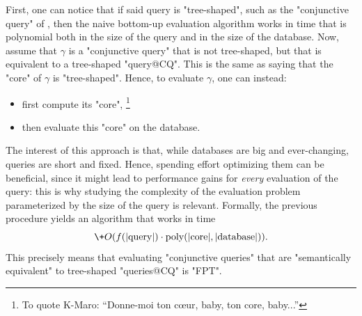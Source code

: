 \begin{marginfigure}
	\centering
	\caption{
		\AP\label{fig:intro-tree-shaped-CQ}
		A "tree-shaped" "conjunctive query" over a "signature"
		with three binary relations denoted by $a$, $b$ and~$c$.
	}
\end{marginfigure}
First, one can notice that if said query is "tree-shaped",
such as the "conjunctive query" of , then the naive
bottom-up evaluation algorithm works in time that is polynomial both
in the size of the query and in the size of the database.
Now, assume that $\gamma$ is a "conjunctive query" that is not
tree-shaped, but that is equivalent to a tree-shaped "query@CQ".
This is the same as saying that the "core" of $\gamma$ is "tree-shaped".
Hence, to evaluate $\gamma$, one can instead:
\begin{itemize}
	\item first compute its "core",%
	\footnote{To quote K-Maro: ``Donne-moi ton cœur, baby, ton core, baby...''}
	\item then evaluate this "core" on the database.
\end{itemize}
The interest of this approach is that, while databases are big and ever-changing,
queries are short and fixed. Hence, spending effort optimizing them can be beneficial,
since it might lead to performance gains
for \emph{every} evaluation of the query: this is why studying the
complexity of the evaluation problem parameterized by the size of
the query is relevant.
Formally, the previous procedure yields an algorithm that works in time
\[
	\+O(f(|\text{query}|) \cdot \poly(|\text{core}|, |\text{database}|)).
\]
This precisely means that evaluating "conjunctive queries" that are "semantically equivalent" to
tree-shaped "queries@CQ" is "FPT".

